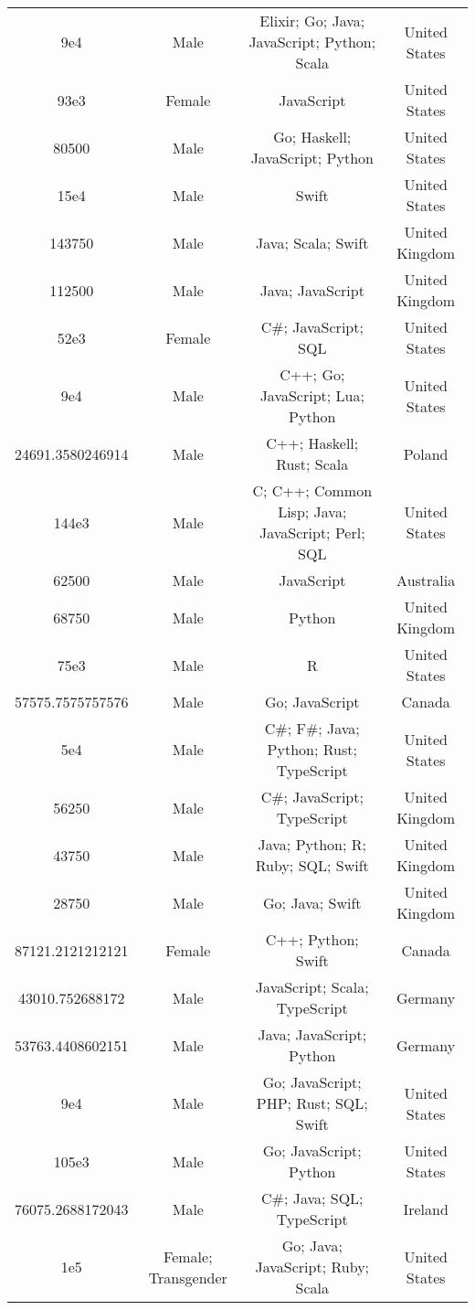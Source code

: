 \begin{center}
\begin{tabular}{ |c|c|c|c| }
9e4  &  Male  &  Elixir; Go; Java; JavaScript; Python; Scala  &  United States  \\ 
93e3  &  Female  &  JavaScript  &  United States  \\ 
80500  &  Male  &  Go; Haskell; JavaScript; Python  &  United States  \\ 
15e4  &  Male  &  Swift  &  United States  \\ 
143750  &  Male  &  Java; Scala; Swift  &  United Kingdom  \\ 
112500  &  Male  &  Java; JavaScript  &  United Kingdom  \\ 
52e3  &  Female  &  C\#; JavaScript; SQL  &  United States  \\ 
9e4  &  Male  &  C++; Go; JavaScript; Lua; Python  &  United States  \\ 
24691.3580246914  &  Male  &  C++; Haskell; Rust; Scala  &  Poland  \\ 
144e3  &  Male  &  C; C++; Common Lisp; Java; JavaScript; Perl; SQL  &  United States  \\ 
62500  &  Male  &  JavaScript  &  Australia  \\ 
68750  &  Male  &  Python  &  United Kingdom  \\ 
75e3  &  Male  &  R  &  United States  \\ 
57575.7575757576  &  Male  &  Go; JavaScript  &  Canada  \\ 
5e4  &  Male  &  C\#; F\#; Java; Python; Rust; TypeScript  &  United States  \\ 
56250  &  Male  &  C\#; JavaScript; TypeScript  &  United Kingdom  \\ 
43750  &  Male  &  Java; Python; R; Ruby; SQL; Swift  &  United Kingdom  \\ 
28750  &  Male  &  Go; Java; Swift  &  United Kingdom  \\ 
87121.2121212121  &  Female  &  C++; Python; Swift  &  Canada  \\ 
43010.752688172  &  Male  &  JavaScript; Scala; TypeScript  &  Germany  \\ 
53763.4408602151  &  Male  &  Java; JavaScript; Python  &  Germany  \\ 
9e4  &  Male  &  Go; JavaScript; PHP; Rust; SQL; Swift  &  United States  \\ 
105e3  &  Male  &  Go; JavaScript; Python  &  United States  \\ 
76075.2688172043  &  Male  &  C\#; Java; SQL; TypeScript  &  Ireland  \\ 
1e5  &  Female; Transgender  &  Go; Java; JavaScript; Ruby; Scala  &  United States  \\ 

\end{tabular}
\end{center}
